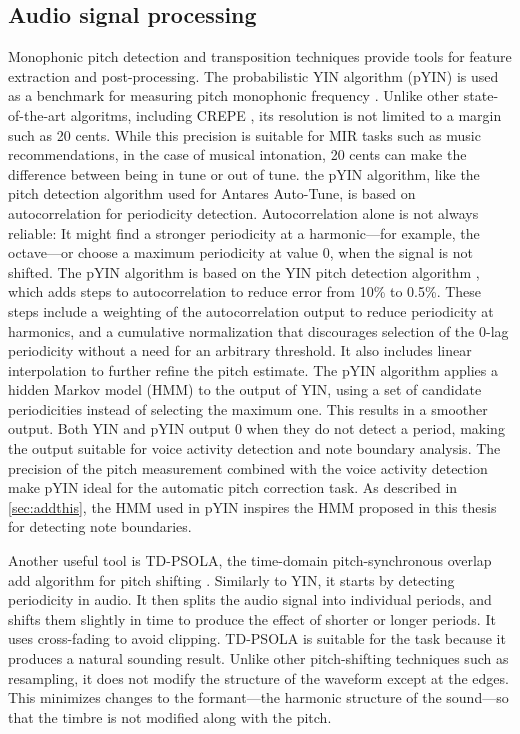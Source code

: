 \subsection{Audio signal processing}
Monophonic pitch detection and transposition techniques provide tools for feature extraction and post-processing. The probabilistic YIN algorithm (pYIN) \cite{mauch2014pyin} is used as a benchmark for measuring pitch monophonic frequency \cite{devaney2020new}. Unlike other state-of-the-art algoritms, including CREPE \cite{kim2018crepe}, its resolution is not limited to a margin such as 20 cents. While this precision is suitable for MIR tasks such as music recommendations, in the case of musical intonation, 20 cents can make the difference between being in tune or out of tune. the pYIN algorithm, like the pitch detection algorithm used for Antares Auto-Tune, is based on autocorrelation for periodicity detection. Autocorrelation alone is not always reliable: It might find a stronger periodicity at a harmonic---for example, the octave---or choose a maximum periodicity at value 0, when the signal is not shifted. The pYIN algorithm is based on the YIN pitch detection algorithm \cite{de2002yin}, which adds steps to autocorrelation to reduce error from 10\% to 0.5\%. These steps include a weighting of the autocorrelation output to reduce periodicity at harmonics, and a cumulative normalization that discourages selection of the 0-lag periodicity without a need for an arbitrary threshold. It also includes linear interpolation to further refine the pitch estimate. The pYIN algorithm applies a hidden Markov model (HMM) to the output of YIN, using a set of candidate periodicities instead of selecting the maximum one. This results in a smoother output. Both YIN and pYIN output 0 when they do not detect a period, making the output suitable for voice activity detection and note boundary analysis. The precision of the pitch measurement combined with the voice activity detection make pYIN ideal for the automatic pitch correction task. As described in \ref{sec:addthis}, the HMM used in pYIN inspires the HMM proposed in this thesis for detecting note boundaries. 

Another useful tool is TD-PSOLA, the time-domain pitch-synchronous overlap add algorithm for pitch shifting \cite{charpentier1986diphone}. Similarly to YIN, it starts by detecting periodicity in audio. It then splits the audio signal into individual periods, and shifts them slightly in time to produce the effect of shorter or longer periods. It uses cross-fading to avoid clipping. TD-PSOLA is suitable for the task because it produces a natural sounding result. Unlike other pitch-shifting techniques such as resampling, it does not modify the structure of the waveform except at the edges. This minimizes changes to the formant---the harmonic structure of the sound---so that the timbre is not modified along with the pitch. 

